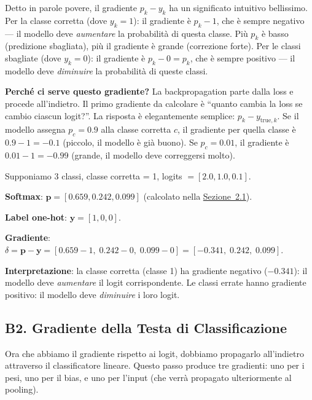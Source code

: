 \documentclass[12pt,a4paper]{article}
\begin{document}
\begin{notabox}
Detto in parole povere, il gradiente $p_k - y_k$ ha un significato intuitivo bellissimo. Per la classe corretta (dove $y_k = 1$): il gradiente \`e $p_k - 1$, che \`e sempre negativo --- il modello deve \emph{aumentare} la probabilit\`a di questa classe. Pi\`u $p_k$ \`e basso (predizione sbagliata), pi\`u il gradiente \`e grande (correzione forte). Per le classi sbagliate (dove $y_k = 0$): il gradiente \`e $p_k - 0 = p_k$, che \`e sempre positivo --- il modello deve \emph{diminuire} la probabilit\`a di queste classi.
\end{notabox}

\textbf{Perch\'e ci serve questo gradiente?} La backpropagation parte dalla loss e procede all'indietro. Il primo gradiente da calcolare \`e ``quanto cambia la loss se cambio ciascun logit?''. La risposta \`e elegantemente semplice: $p_k - y_{\text{true},k}$. Se il modello assegna $p_c = 0.9$ alla classe corretta $c$, il gradiente per quella classe \`e $0.9 - 1 = -0.1$ (piccolo, il modello \`e gi\`a buono). Se $p_c = 0.01$, il gradiente \`e $0.01 - 1 = -0.99$ (grande, il modello deve correggersi molto).

\begin{examplebox}
Supponiamo 3 classi, classe corretta = 1, logits $= [2.0, 1.0, 0.1]$.

\textbf{Softmax}: $\mathbf{p} = [0.659, 0.242, 0.099]$ (calcolato nella \hyperref[sec:softmax]{Sezione~2.1}).

\textbf{Label one-hot}: $\mathbf{y} = [1, 0, 0]$.

\textbf{Gradiente}: $\delta = \mathbf{p} - \mathbf{y} = [0.659 - 1,\; 0.242 - 0,\; 0.099 - 0] = [-0.341,\; 0.242,\; 0.099]$.

\textbf{Interpretazione}: la classe corretta (classe 1) ha gradiente negativo ($-0.341$): il modello deve \emph{aumentare} il logit corrispondente. Le classi errate hanno gradiente positivo: il modello deve \emph{diminuire} i loro logit.
\end{examplebox}


\subsection{B2. Gradiente della Testa di Classificazione} \label{sec:grad_class}

Ora che abbiamo il gradiente rispetto ai logit, dobbiamo propagarlo all'indietro attraverso il classificatore lineare. Questo passo produce tre gradienti: uno per i pesi, uno per il bias, e uno per l'input (che verr\`a propagato ulteriormente al pooling).
\end{document}
